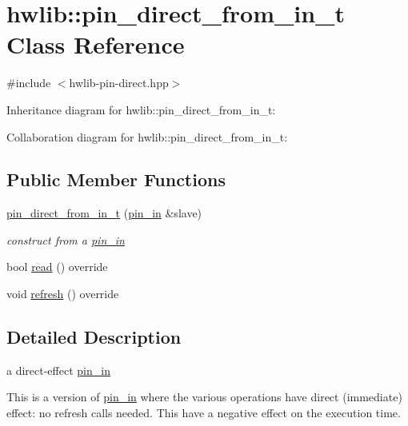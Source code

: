 \hypertarget{classhwlib_1_1pin__direct__from__in__t}{}\section{hwlib\+:\+:pin\+\_\+direct\+\_\+from\+\_\+in\+\_\+t Class Reference}
\label{classhwlib_1_1pin__direct__from__in__t}


{\ttfamily \#include $<$hwlib-\/pin-\/direct.\+hpp$>$}



Inheritance diagram for hwlib\+:\+:pin\+\_\+direct\+\_\+from\+\_\+in\+\_\+t\+:


Collaboration diagram for hwlib\+:\+:pin\+\_\+direct\+\_\+from\+\_\+in\+\_\+t\+:
\subsection*{Public Member Functions}
\begin{DoxyCompactItemize}
\item 
\mbox{\label{classhwlib_1_1pin__direct__from__in__t_a26dc24804d3f6c79a78266d3716e1094}} 
\hyperlink{classhwlib_1_1pin__direct__from__in__t_a26dc24804d3f6c79a78266d3716e1094}{pin\+\_\+direct\+\_\+from\+\_\+in\+\_\+t} (\hyperlink{classhwlib_1_1pin__in}{pin\+\_\+in} \&slave)
\begin{DoxyCompactList}\small\item\em construct from a \hyperlink{classhwlib_1_1pin__in}{pin\+\_\+in} \end{DoxyCompactList}\item 
bool \hyperlink{classhwlib_1_1pin__direct__from__in__t_aa0f886a0c110b2bd259c6d3d25e50ee3}{read} () override
\item 
void \hyperlink{classhwlib_1_1pin__direct__from__in__t_a20c81ad1110ed11c39c4f555c74e7e3a}{refresh} () override
\end{DoxyCompactItemize}


\subsection{Detailed Description}
a direct-\/effect \hyperlink{classhwlib_1_1pin__in}{pin\+\_\+in}

This is a version of \hyperlink{classhwlib_1_1pin__in}{pin\+\_\+in} where the various operations have direct (immediate) effect\+: no refresh calls needed. This have a negative effect on the execution time.

